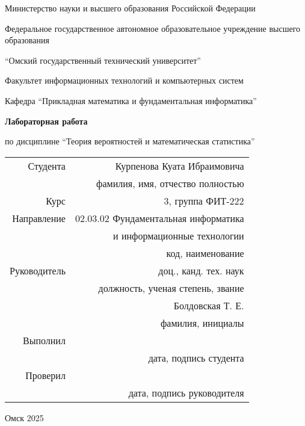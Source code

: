 \thispagestyle{empty}

\begin{center}
    Министерство науки и высшего образования Российской Федерации

    Федеральное государственное автономное образовательное учреждение высшего образования

    \enquote{Омский государственный технический университет}

    \vspace{1cm}
    Факультет информационных технологий и компьютерных систем

    Кафедра \enquote{Прикладная математика и фундаментальная информатика}

    \vspace{4cm}
    \textbf{Лабораторная работа}

    по дисциплине \enquote{Теория вероятностей и математическая статистика}
\end{center}

\vspace{2cm}
\begin{flushright}    
    \begin{tabular}{ r r }
        Студента & Курпенова Куата Ибраимовича \\
        \cline{2-2}
        & \tiny{фамилия, имя, отчество полностью} \\

        Курс & 3, группа ФИТ-222 \\
        \cline{2-2}
        Направление & 02.03.02 Фундаментальная информатика \\
        \cline{2-2}
        & и информационные технологии \\
        \cline{2-2}
        & \tiny{код, наименование} \\

        Руководитель & доц., канд. тех. наук \\
        \cline{2-2}
        & \tiny{должность, ученая степень, звание} \\
        & Болдовская Т. Е. \\
        \cline{2-2}
        & \tiny{фамилия, инициалы} \\

        Выполнил & \\
        \cline{2-2}
        & \tiny{дата, подпись студента} \\

        Проверил & \\
        \cline{2-2}
        & \tiny{дата, подпись руководителя} \\

    \end{tabular}
\end{flushright}

\vspace*{\fill}
\begin{center}
    Омск 2025
\end{center}
